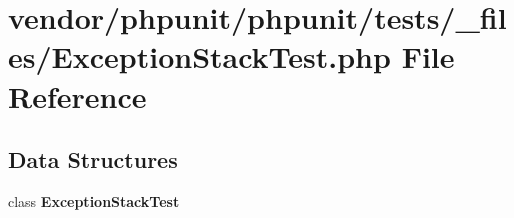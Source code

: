 \section{vendor/phpunit/phpunit/tests/\+\_\+files/\+Exception\+Stack\+Test.php File Reference}
\label{_exception_stack_test_8php}
\subsection*{Data Structures}
\begin{DoxyCompactItemize}
\item 
class {\bf Exception\+Stack\+Test}
\end{DoxyCompactItemize}
